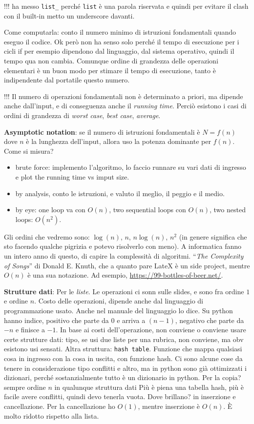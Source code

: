 \documentclass[10pt, a4paper, titlepage]{book}
\begin{document}
!!! ha messo \texttt{list\_} perché \texttt{list} è una parola riservata e quindi per evitare il clash con il built-in metto un underscore davanti.

Come computarla: conto il numero minimo di istruzioni fondamentali quando eseguo il codice.
Ok però non ha senso solo perché il tempo di esecuzione per i cicli if per esempio dipendono dal linguaggio, dal sistema operativo, quindi il tempo qua non cambia. Comunque ordine di grandezza delle operazioni elementari è un buon modo per stimare il tempo di esecuzione, tanto è indipendente dal portatile questo numero.

!!! Il numero di operazioni fondamentali non è determinato a priori, ma dipende anche dall'input, e di conseguenza anche il \textit{running time}. Perciò esistono i casi di ordini di grandezza di \textit{worst case}, \textit{best case}, \textit{average}.

\textbf{Asymptotic notation}: se il numero di istruzioni fondamentali è $N=f(n)$ dove $n$ è la lunghezza dell'input, allora uso la potenza dominante per $f(n)$.
Come si misura?
\begin{itemize}
	\item brute force: implemento l'algoritmo, lo faccio runnare su vari dati di ingresso e plot the running time vs imput size.
	\item by analysis, conto le istruzioni, e valuto il meglio, il peggio e il medio.
	\item by eye: one loop va con $O(n)$, two sequential loops con $O(n)$, two nested loops: $O(n^2)$.
\end{itemize} 


Gli ordini che vedremo sono: $\log(n)$, $n$, $n\log(n)$, $n^2$ (in genere significa che sto facendo qualche pigrizia e potevo risolverlo con meno).
A informatica fanno un intero anno di questo, di capire la complessità di algoritmi.
``\textit{The Complexity of Songs}'' di Donald E. Knuth, che a quanto pare LateX è un side project, mentre $O(n)$ è una sua notazione. Ad esempio, \url{https://99-bottles-of-beer.net/}.

\textbf{Strutture dati}: Per le \textit{liste}. Le operazioni ci sonn sulle slides, e sono fra ordine $1$ e ordine $n$. Costo delle operazioni, dipende anche dal linguaggio di programmazione usato. Anche nel manuale del linguaggio lo dice.
Su python hanno indice, positivo che parte da $0$ e arriva a $(n-1)$, negativo che parte da $-n$ e finisce a $-1$. 
In base ai costi dell'operazione, non conviene o conviene usare certe strutture dati: tipo, se usi due liste per una rubrica, non conviene, ma obv esistono usi sensati.
Altra struttura: \texttt{hash table}. Funzione che mappa qualsiasi cosa in ingresso con la cosa in uscita, con funzione hash. Ci sono alcune cose da tenere in considerazione tipo conflitti e altro, ma in python sono già ottimizzati i dizionari, perché sostanzialmente tutto è un dizionario in python.
Per la copia? sempre ordine $n$ in qualunque struttura dati
Più è piena una tabella hash, più è facile avere conflitti, quindi devo tenerla vuota. Dove brillano? in inserzione e cancellazione. Per la cancellazione ho $O(1)$, mentre inserzione è $O(n)$. È molto ridotto rispetto alla lista.
\end{document}
